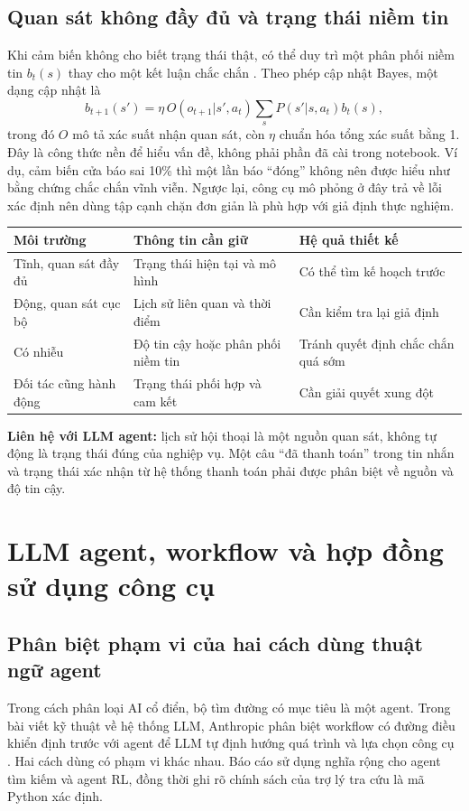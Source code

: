 \subsection{Quan sát không đầy đủ và trạng thái niềm tin}
Khi cảm biến không cho biết trạng thái thật, có thể duy trì một phân phối niềm tin
$b_t(s)$ thay cho một kết luận chắc chắn \cite{pomdp}. Theo phép cập nhật Bayes, một dạng cập nhật là
\[
b_{t+1}(s')=\eta\,O(o_{t+1}|s',a_t)\sum_s P(s'|s,a_t)b_t(s),
\]
trong đó $O$ mô tả xác suất nhận quan sát, còn $\eta$ chuẩn hóa tổng xác suất bằng 1.
Đây là công thức nền để hiểu vấn đề, không phải phần đã cài trong notebook. Ví dụ,
cảm biến cửa báo sai 10\% thì một lần báo ``đóng'' không nên được hiểu như bằng chứng
chắc chắn vĩnh viễn. Ngược lại, công cụ mô phỏng ở đây trả về lỗi xác định nên dùng
tập cạnh chặn đơn giản là phù hợp với giả định thực nghiệm.

\begin{center}\small
\begin{tabularx}{\linewidth}{@{}p{3.3cm}XX@{}}\toprule
\textbf{Môi trường} & \textbf{Thông tin cần giữ} & \textbf{Hệ quả thiết kế}\\\midrule
Tĩnh, quan sát đầy đủ & Trạng thái hiện tại và mô hình & Có thể tìm kế hoạch trước\\
Động, quan sát cục bộ & Lịch sử liên quan và thời điểm & Cần kiểm tra lại giả định\\
Có nhiễu & Độ tin cậy hoặc phân phối niềm tin & Tránh quyết định chắc chắn quá sớm\\
Đối tác cũng hành động & Trạng thái phối hợp và cam kết & Cần giải quyết xung đột\\\bottomrule
\end{tabularx}\end{center}
\textbf{Liên hệ với LLM agent:} lịch sử hội thoại là một nguồn quan sát, không tự động
là trạng thái đúng của nghiệp vụ. Một câu ``đã thanh toán'' trong tin nhắn và trạng
thái xác nhận từ hệ thống thanh toán phải được phân biệt về nguồn và độ tin cậy.

\par
\section{LLM agent, workflow và hợp đồng sử dụng công cụ}
\subsection{Phân biệt phạm vi của hai cách dùng thuật ngữ agent}
Trong cách phân loại AI cổ điển, bộ tìm đường có mục tiêu là một agent. Trong bài viết
kỹ thuật về hệ thống LLM, Anthropic phân biệt workflow có đường điều khiển định trước
với agent để LLM tự định hướng quá trình và lựa chọn công cụ \cite{effective}.
Hai cách dùng có phạm vi khác nhau. Báo cáo sử dụng nghĩa rộng cho agent tìm kiếm và
agent RL, đồng thời ghi rõ chính sách của trợ lý tra cứu là mã Python xác định.

